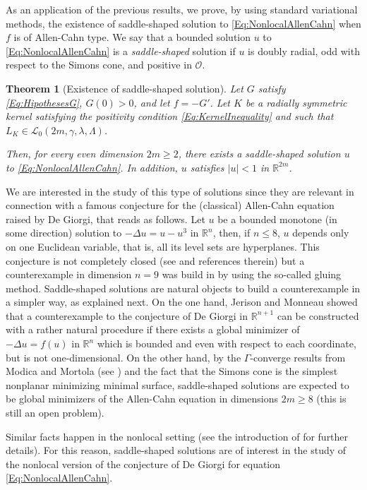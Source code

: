 \documentclass[12pt,reqno]{amsart}
\newtheorem{theorem}{Theorem}[section]
\theoremstyle{definition}
\theoremstyle{remark}
\newcommand{\con}[1]{\mathbb{#1}}
\newcommand{\R}{\con{R}} %
\newcommand{\lcal}{\mathcal{L}}
\newcommand{\ocal}{\mathcal{O}}
\newcommand{\s}{\gamma}
\numberwithin{equation}{section}
\begin{document}
As an application of the previous results, we prove, by using standard variational methods, the existence of saddle-shaped solution to \eqref{Eq:NonlocalAllenCahn} when $f$ is of Allen-Cahn type. We say that a bounded solution $u$ to \eqref{Eq:NonlocalAllenCahn} is a \emph{saddle-shaped} solution if $u$ is doubly radial, odd with respect to the Simons cone, and positive in $\ocal$. 

\begin{theorem}[Existence of saddle-shaped solution]
	\label{Th:Existence}
	Let $G$ satisfy \eqref{Eq:HipothesesG}, $G(0)>0$, and let $f=-G'$. Let $K$ be a radially symmetric kernel satisfying the positivity condition \eqref{Eq:KernelInequality} and such that $L_K\in \lcal_0(2m, \s, \lambda, \Lambda)$. 
	
	Then, for every even dimension $2m \geq 2$, there exists a saddle-shaped solution $u$ to \eqref{Eq:NonlocalAllenCahn}. In addition, $u$ satisfies $|u|<1$ in $\R^{2m}$.
\end{theorem}

We are interested in the study of this type of solutions since they are relevant in connection with a famous conjecture for the (classical) Allen-Cahn equation raised by De Giorgi, that reads as follows. Let $u$ be a bounded monotone (in some direction) solution to $-\Delta u = u - u^3$ in $\R^n$, then, if $n \leq 8$, $u$ depends only on one Euclidean variable, that is, all its level sets are hyperplanes. This conjecture is not completely closed (see \cite{FarinaValdinoci-DeGiorgi} and references therein) but a counterexample in dimension $n=9$ was build in \cite{delPinoKowalczykWei} by using the so-called gluing method. Saddle-shaped solutions are natural objects to build a counterexample in a simpler way, as explained next. On the one hand, Jerison and Monneau \cite{JerisonMonneau} showed that a counterexample to the conjecture of De Giorgi in $\R^{n+1}$ can be constructed with a rather natural procedure if there exists a global minimizer of $-\Delta u = f(u)$ in $\R^n$ which is bounded and even with respect to each coordinate, but is not one-dimensional. On the other hand, by the $\Gamma$-converge results from Modica and Mortola (see \cite{Modica,ModicaMortola}) and the fact that the Simons cone is the simplest nonplanar minimizing minimal surface, saddle-shaped solutions are expected to be global minimizers of the Allen-Cahn equation in dimensions $2m\geq 8$ (this is still an open problem).

Similar facts happen in the nonlocal setting (see the introduction of \cite{Felipe-Sanz-Perela:SaddleFractional} for further details). For this reason, saddle-shaped solutions are of interest in the study of the nonlocal version of the conjecture of De Giorgi for equation \eqref{Eq:NonlocalAllenCahn}.
\end{document}
